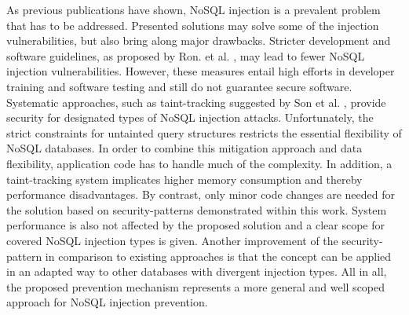 As previous publications have shown, NoSQL injection is a prevalent problem that has to be addressed. Presented solutions may solve some of the injection vulnerabilities, but also bring along major drawbacks. Stricter development and software guidelines, as proposed by Ron. et al. \cite{Ron:2016}, may lead to fewer NoSQL injection vulnerabilities. However, these measures entail high efforts in developer training and software testing and still do not guarantee secure software. Systematic approaches, such as taint-tracking suggested by Son et al. \cite{Son:2013}, provide security for designated types of NoSQL injection attacks. Unfortunately, the strict constraints for untainted query structures restricts the essential flexibility of NoSQL databases. In order to combine this mitigation approach and data flexibility, application code has to handle much of the complexity. In addition, a taint-tracking system implicates higher memory consumption and thereby performance disadvantages. By contrast, only minor code changes are needed for the solution based on security-patterns demonstrated within this work. System performance is also not affected by the proposed solution and a clear scope for covered NoSQL injection types is given. Another improvement of the security-pattern in comparison to existing approaches is that the concept can be applied in an adapted way to other databases with divergent injection types. All in all, the proposed prevention mechanism represents a more general and well scoped approach for NoSQL injection prevention.